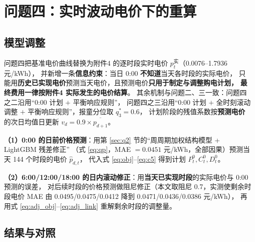 \section{问题四\nobreak：实时波动电价下的重算}
\label{sec:q4}

\subsection{模型调整}

问题四把基准电价曲线替换为附件4 的逐时段实时电价 $p_t^{\text{实}}$（0.0076--1.7936 元/kWh\nobreak）\nobreak，
并新增一条\textbf{信息约束}\nobreak：当日 0:00 \textbf{不知道}当天各时段的实际电价\nobreak，
只能用\textbf{历史已实现电价}预测当天电价\nobreak，且预测电价\textbf{只用于制定与调整购电计划\nobreak，
最终费用一律按附件4 实际发生的电价结算}\nobreak。
其余机制与问题二、三一致\nobreak：问题四之二沿用“0:00 计划 $+$ 平衡响应规则\nobreak”\nobreak，
问题四之三沿用“0:00 计划 $+$ 全时刻滚动调整 $+$ 平衡响应规则\nobreak”\nobreak，报童分位取 $q_3^*=0.6$\nobreak，
计划阶段的残值系数按\textbf{预测电价}的次日均值日更新 $v_d=0.9\times\overline{\hat p_{d+1}}$\nobreak。

\textbf{（1\nobreak）0:00 的日前价格预测}\nobreak：用第 \ref{sec:q2} 节的“周周期加权结构模型 + LightGBM 残差修正\nobreak”
（式 \eqref{eq:qp}\nobreak，MAE $=0.0451$ 元/kWh\nobreak，全部因果\nobreak）预测当天 144 个时段的电价 $\hat p_{d,t}$\nobreak，
代入式 \eqref{eq:obj}--\eqref{eq:c5} 得到计划 $P^0_t,C^0_t,D^0_t$\nobreak。

\textbf{（2\nobreak）6:00/12:00/18:00 的日内滚动修正}\nobreak：用\textbf{当天已实现时段}的实际电价与 0:00 预测的误差\nobreak，
对后续时段的价格预测做阻尼修正（本文取阻尼 0.7\nobreak，实测使剩余时段电价 MAE 由
0.0495/0.0475/0.0412 降到 0.0471/0.0436/0.0386 元/kWh\nobreak）\nobreak，
再用式 \eqref{eq:adj_obj}--\eqref{eq:adj_link} 重解剩余时段的调整量\nobreak。

\subsection{结果与对照}

